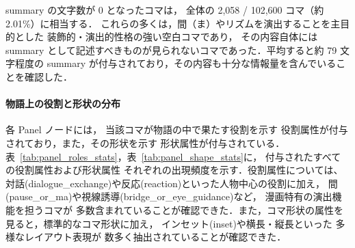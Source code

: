 \documentclass[a4j,12pt,dvipdfmx]{jsreport}
\begin{document}
summary の文字数が 0 となったコマは，
全体の 2{,}058 / 102{,}600 コマ（約 2.01\%）に相当する．
これらの多くは，間（ま）やリズムを演出することを主目的とした
装飾的・演出的性格の強い空白コマであり，
その内容自体には summary として記述すべきものが見られないコマであった．平均すると約 79 文字程度の
summary が付与されており，その内容も十分な情報量を含んでいることを確認した．

\paragraph{物語上の役割と形状の分布}
各 Panel ノードには，
当該コマが物語の中で果たす役割を示す
役割属性が付与されており，また，その形状を示す
形状属性が付与されている．
表~\ref{tab:panel_roles_stats}，表~\ref{tab:panel_shape_stats}に，
付与されたすべての役割属性および形状属性
それぞれの出現頻度を示す．役割属性については、対話(dialogue\_exchange)や反応(reaction)といった人物中心の役割に加え，
間(pause\_or\_ma)や視線誘導(bridge\_or\_eye\_guidance)など，
漫画特有の演出機能を担うコマが
多数含まれていることが確認できた．また，コマ形状の属性を見ると，標準的なコマ形状に加え，
インセット(inset)や横長・縦長といった
多様なレイアウト表現が
数多く抽出されていることが確認できた．
\end{document}
